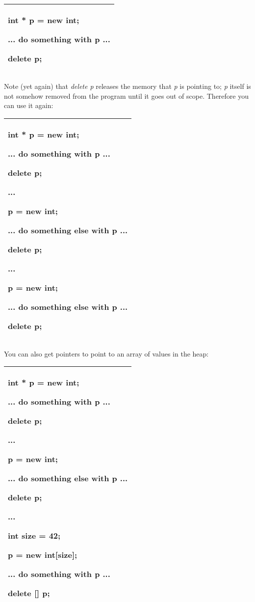 \documentclass[
]{article}
\begin{document}
\begin{longtable}[]{@{}l@{}}
\toprule
\endhead
\begin{minipage}[t]{0.97\columnwidth}\raggedright
int * p = new int;

... do something with p ...

delete p;\strut
\end{minipage}\tabularnewline
\bottomrule
\end{longtable}

Note (yet again) that \emph{delete p} releases the memory that \emph{p}
is pointing to; \emph{p} itself is not somehow removed from the program
until it goes out of scope. Therefore you can use it again:

\begin{longtable}[]{@{}l@{}}
\toprule
\endhead
\begin{minipage}[t]{0.97\columnwidth}\raggedright
int * p = new int;

... do something with p ...

delete p;

...

p = new int;

... do something else with p ...

delete p;

...

p = new int;

... do something else with p ...

delete p;\strut
\end{minipage}\tabularnewline
\bottomrule
\end{longtable}

You can also get pointers to point to an array of values in the heap:

\begin{longtable}[]{@{}l@{}}
\toprule
\endhead
\begin{minipage}[t]{0.97\columnwidth}\raggedright
int * p = new int;

... do something with p ...

delete p;

...

p = new int;

... do something else with p ...

delete p;

...

int size = 42;

p = new int{[}size{]};

... do something with p ...

delete {[}{]} p; \strut
\end{minipage}\tabularnewline
\bottomrule
\end{longtable}
\end{document}
